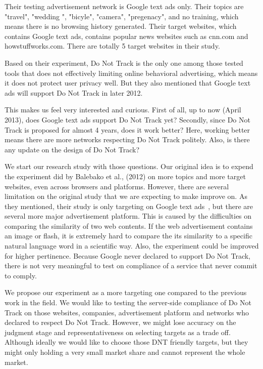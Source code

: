 \documentclass{sig-alternate}
\begin{document}
Their testing advertisement network is Google text ads only. Their topics are "travel", "wedding ", "bicyle", "camera", "pregenacy", and no training, which means there is no browsing history generated. Their target websites, which contains Google text ads, contains popular news websites such as cnn.com and howstuffworks.com. There are totally 5 target websites in their study.

Based on their experiment, Do Not Track is the only one among those tested tools that does not effectively limiting online behavioral advertising, which means it does not protect user privacy well. But they also mentioned that Google text ads will support Do Not Track in later 2012.

This makes us feel very interested and curious. First of all, up to now (April 2013), does Google text ads support Do Not Track yet? Secondly, since Do Not Track is proposed for almost 4 years, does it work better? Here, working better means there are more networks respecting Do Not Track politely. Also, is there any update on the design of Do Not Track?

We start our research study with those questions. Our original idea is to expend the experiment did by Balebako et al., (2012) on more topics and more target websites, even across browsers and platforms. However, there are several limitation on the original study that we are expecting to make improve on. As they mentioned, their study is only targeting on Google text ads~\cite{balebako2012measuring}, but there are several more major advertisement platform. This is caused by the difficulties on comparing the similarity of two web contents. If the web advertisement contains an image or flash, it is extremely hard to compare the its similarity to a specific natural language word in a scientific way. Also, the experiment could be improved for higher pertinence. Because Google never declared to support Do Not Track, there is not very meaningful to test on compliance of a service that never commit to comply. 

We propose our experiment as a more targeting one compared to the previous work in the field. We would like to testing the server-side compliance of Do Not Track on those websites, companies, advertisement platform and networks who declared to respect Do Not Track. However, we might lose accuracy on the judgment stage and representativeness on selecting targets as a trade off. Although ideally we would like to choose those DNT friendly targets, but they might only holding a very small market share and cannot represent the whole market.
\end{document}
